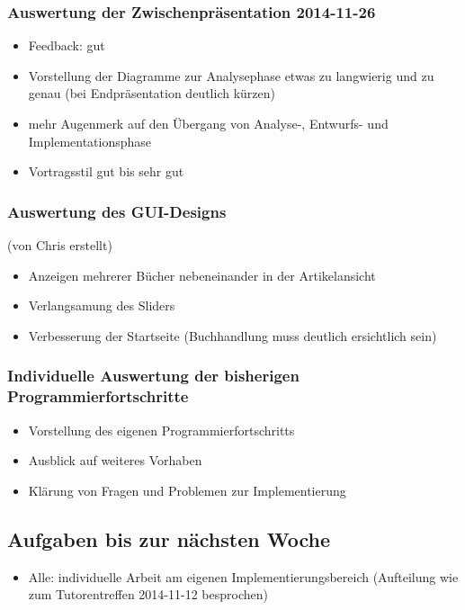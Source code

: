 \documentclass[12pt,a4paper]{article}
\begin{document}
\subsubsection*{Auswertung der Zwischenpräsentation 2014-11-26}
\begin{itemize}
\item Feedback: gut
\item Vorstellung der Diagramme zur Analysephase etwas zu langwierig und zu genau (bei Endpräsentation deutlich kürzen)
\item mehr Augenmerk auf den Übergang von Analyse-, Entwurfs- und Implementationsphase
\item Vortragsstil gut bis sehr gut
\end{itemize}

\subsubsection*{Auswertung des GUI-Designs}
(von Chris erstellt)
\begin{itemize}
\item Anzeigen mehrerer Bücher nebeneinander in der Artikelansicht
\item Verlangsamung des Sliders
\item Verbesserung der Startseite (Buchhandlung muss deutlich ersichtlich sein)
\end{itemize}

\subsubsection*{Individuelle Auswertung der bisherigen Programmierfortschritte}
\begin{itemize}
\item Vorstellung des eigenen Programmierfortschritts
\item Ausblick auf weiteres Vorhaben
\item Klärung von Fragen und Problemen zur Implementierung
\end{itemize}

\subsection*{Aufgaben bis zur nächsten Woche}
\medskip
\begin{itemize}
\item Alle: individuelle Arbeit am eigenen Implementierungsbereich (Aufteilung wie zum Tutorentreffen 2014-11-12 besprochen)
\end{itemize}
\end{document}
